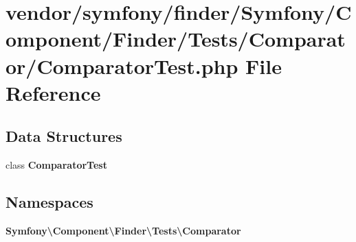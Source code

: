 \section{vendor/symfony/finder/\+Symfony/\+Component/\+Finder/\+Tests/\+Comparator/\+Comparator\+Test.php File Reference}
\label{_comparator_test_8php}
\subsection*{Data Structures}
\begin{DoxyCompactItemize}
\item 
class {\bf Comparator\+Test}
\end{DoxyCompactItemize}
\subsection*{Namespaces}
\begin{DoxyCompactItemize}
\item 
 {\bf Symfony\textbackslash{}\+Component\textbackslash{}\+Finder\textbackslash{}\+Tests\textbackslash{}\+Comparator}
\end{DoxyCompactItemize}
